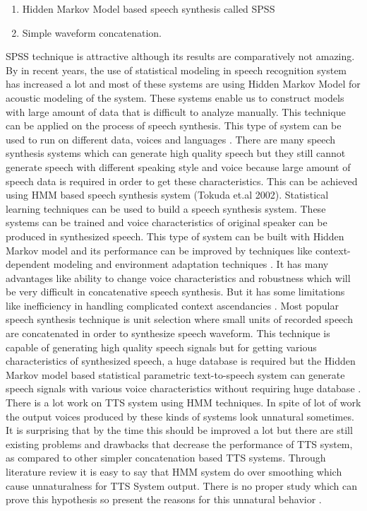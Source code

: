 \begin{enumerate}
	\item Hidden Markov Model based speech synthesis called SPSS
	\item Simple waveform concatenation.
\end{enumerate}

SPSS technique is attractive although its results are comparatively not amazing. By \cite{donovan1999hidden} in recent years, 
the use of statistical modeling in speech recognition system has increased a lot and most of these
systems are using Hidden Markov Model for acoustic modeling of the system. These systems enable us to construct models
with large amount of data that is difficult to analyze manually. This technique can be applied on the process of speech
synthesis. This type of system can be used to run on different data, voices and languages \cite{donovan1999hidden}. 
There are many speech synthesis systems which can generate high quality speech but they still cannot generate speech
with different speaking style and voice because large amount of speech data is required in order to get these characteristics.
This can be achieved using HMM based speech synthesis system (Tokuda et.al 2002). Statistical learning techniques can be
used to build a speech synthesis system. These systems can be trained and voice characteristics of original speaker can be
produced in synthesized speech. This type of system can be built with Hidden Markov model and its performance can be
improved by techniques like context-dependent modeling and environment adaptation techniques \cite{tokuda2000speech}. It has
many advantages like ability to change voice characteristics and robustness which will be very difficult in concatenative
speech synthesis. But it has some limitations like inefficiency in handling complicated context ascendancies \cite{ze2013statistical}. 
Most popular speech synthesis technique is unit selection where small units of recorded speech are concatenated in
order to synthesize speech waveform. This technique is capable of generating high quality speech signals but for getting
various characteristics of synthesized speech, a huge database is required but the Hidden Markov model based statistical
parametric text-to-speech system can generate speech signals with various voice characteristics without requiring huge
database \cite{zen2007hmm}. There is a lot work on TTS system using HMM techniques. In spite of lot of work the output
voices produced by these kinds of systems look unnatural sometimes. It is surprising that by the time this should be improved
a lot but there are still existing problems and drawbacks that decrease the performance of TTS system, as compared to other
simpler concatenation based TTS systems. Through literature review it is easy to say that HMM system do over smoothing
which cause unnaturalness for TTS System output. There is no proper study which can prove this hypothesis so \cite{merritt2013investigating} 
present the reasons for this unnatural behavior \cite{merritt2013investigating}.


